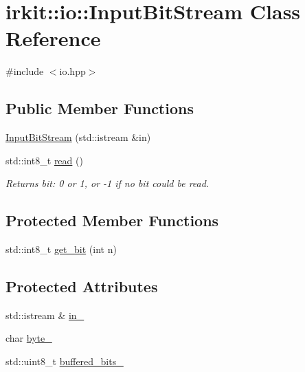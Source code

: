 \hypertarget{classirkit_1_1io_1_1InputBitStream}{}\section{irkit\+:\+:io\+:\+:Input\+Bit\+Stream Class Reference}
\label{classirkit_1_1io_1_1InputBitStream}


{\ttfamily \#include $<$io.\+hpp$>$}

\subsection*{Public Member Functions}
\begin{DoxyCompactItemize}
\item 
\mbox{\hyperlink{classirkit_1_1io_1_1InputBitStream_a5145fd4ac5cdeed31168fcefc924688d}{Input\+Bit\+Stream}} (std\+::istream \&in)
\item 
std\+::int8\+\_\+t \mbox{\hyperlink{classirkit_1_1io_1_1InputBitStream_aa62802e3cf706b0d880c4ff8e348b9be}{read}} ()
\begin{DoxyCompactList}\small\item\em Returns bit\+: 0 or 1, or -\/1 if no bit could be read. \end{DoxyCompactList}\end{DoxyCompactItemize}
\subsection*{Protected Member Functions}
\begin{DoxyCompactItemize}
\item 
std\+::int8\+\_\+t \mbox{\hyperlink{classirkit_1_1io_1_1InputBitStream_a4d0f6d09f0fa4913fbb4e150e6354f52}{get\+\_\+bit}} (int n)
\end{DoxyCompactItemize}
\subsection*{Protected Attributes}
\begin{DoxyCompactItemize}
\item 
std\+::istream \& \mbox{\hyperlink{classirkit_1_1io_1_1InputBitStream_a351a1f4be11c5b3bd34e5ed4e2885ebe}{in\+\_\+}}
\item 
char \mbox{\hyperlink{classirkit_1_1io_1_1InputBitStream_ad5ea68472de8996f65e65b2c8bb810b0}{byte\+\_\+}}
\item 
std\+::uint8\+\_\+t \mbox{\hyperlink{classirkit_1_1io_1_1InputBitStream_af3f25b6269fdd432f07708a13d03cdad}{buffered\+\_\+bits\+\_\+}}
\end{DoxyCompactItemize}


